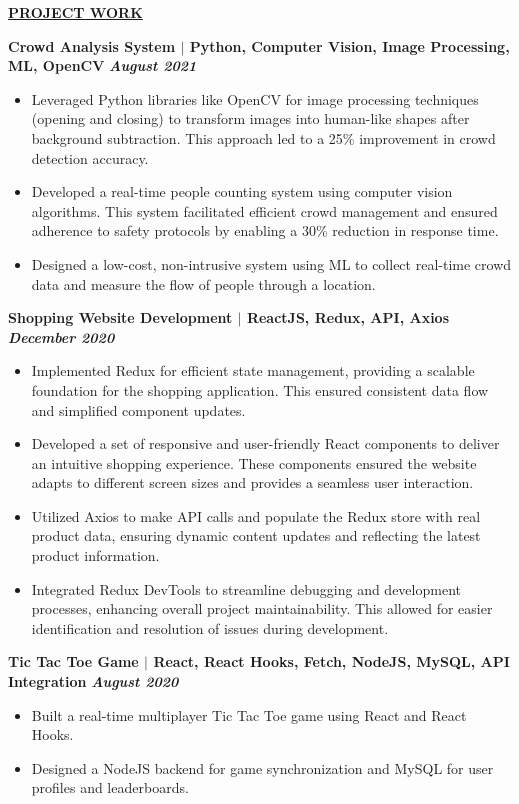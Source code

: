 \documentclass{article}
\begin{document}
\noindent \textbf{\underline{PROJECT WORK}} 

\noindent \textbf{Crowd Analysis System $\mid$ Python, Computer Vision, Image Processing, ML, OpenCV} \textit{\hfill \textbf{August 2021}}
\begin{itemize}[noitemsep,nolistsep,leftmargin=*]
  \item {\small Leveraged Python libraries like OpenCV for image processing techniques (opening and closing) to transform images into human-like shapes after background subtraction. This approach led to a 25\% improvement in crowd detection accuracy.}
  \item {\small Developed a real-time people counting system using computer vision algorithms. This system facilitated efficient crowd management and ensured adherence to safety protocols by enabling a 30\% reduction in response time.}
  \item {\small Designed a low-cost, non-intrusive system using ML to collect real-time crowd data and measure the flow of people through a location.}
\end{itemize}
\vspace{1mm} 
\noindent \textbf{Shopping Website Development $\mid$ ReactJS, Redux, API, Axios} \textit{\hfill \textbf{December 2020}} 
\begin{itemize}[noitemsep,nolistsep,leftmargin=*]
  \item {\small Implemented Redux for efficient state management, providing a scalable foundation for the shopping application. This ensured consistent data flow and simplified component updates.}
  \item {\small Developed a set of responsive and user-friendly React components to deliver an intuitive shopping experience. These components ensured the website adapts to different screen sizes and provides a seamless user interaction.}
  \item {\small Utilized Axios to make API calls and populate the Redux store with real product data, ensuring dynamic content updates and reflecting the latest product information.}
  \item {\small Integrated Redux DevTools to streamline debugging and development processes, enhancing overall project maintainability. This allowed for easier identification and resolution of issues during development.}
\end{itemize}
\vspace{1mm} 
\noindent \textbf{Tic Tac Toe Game $\mid$ React, React Hooks, Fetch, NodeJS, MySQL, API Integration} \textit{\hfill \textbf{August 2020}} 
\begin{itemize}[noitemsep,nolistsep,leftmargin=*]
  \item {\small Built a real-time multiplayer Tic Tac Toe game using React and React Hooks.}
  \item {\small Designed a NodeJS backend for game synchronization and MySQL for user profiles and leaderboards.}\\
\end{itemize}


\end{document}
